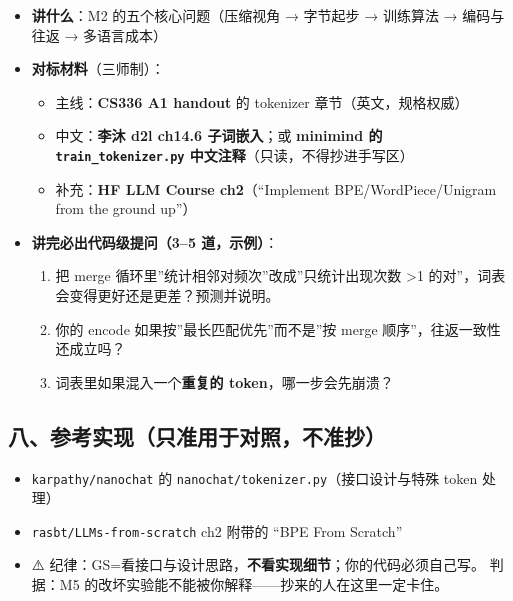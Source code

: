 \documentclass[
  chinese,
  11pt,
]{ctexart}
\providecommand{\tightlist}{%
  \setlength{\itemsep}{0pt}\setlength{\parskip}{0pt}}
\begin{document}
\begin{itemize}
\tightlist
\item
  \textbf{讲什么}：M2 的五个核心问题（压缩视角 → 字节起步 → 训练算法 → 编码与往返 → 多语言成本）
\item
  \textbf{对标材料}（三师制）：

  \begin{itemize}
  \tightlist
  \item
    主线：\textbf{CS336 A1 handout} 的 tokenizer 章节（英文，规格权威）
  \item
    中文：\textbf{李沐 d2l ch14.6 子词嵌入}；或 \textbf{minimind 的 \texttt{train\_tokenizer.py} 中文注释}（只读，不得抄进手写区）
  \item
    补充：\textbf{HF LLM Course ch2}（``Implement BPE/WordPiece/Unigram from the ground up''）
  \end{itemize}
\item
  \textbf{讲完必出代码级提问（3--5 道，示例）}：

  \begin{enumerate}
  \def\labelenumi{\arabic{enumi}.}
  \tightlist
  \item
    把 merge 循环里''统计相邻对频次''改成''只统计出现次数 \textgreater1 的对''，词表会变得更好还是更差？预测并说明。
  \item
    你的 encode 如果按''最长匹配优先''而不是''按 merge 顺序''，往返一致性还成立吗？
  \item
    词表里如果混入一个\textbf{重复的 token}，哪一步会先崩溃？
  \end{enumerate}
\end{itemize}

\subsection{\texorpdfstring{八、参考实现（\textbf{只准用于对照，不准抄}）}{八、参考实现（只准用于对照，不准抄）}}\label{ux516bux53c2ux8003ux5b9eux73b0ux53eaux51c6ux7528ux4e8eux5bf9ux7167ux4e0dux51c6ux6284}

\begin{itemize}
\tightlist
\item
  \texttt{karpathy/nanochat} 的 \texttt{nanochat/tokenizer.py}（接口设计与特殊 token 处理）
\item
  \texttt{rasbt/LLMs-from-scratch} ch2 附带的 ``BPE From Scratch''
\item
  ⚠️ 纪律：GS=看接口与设计思路，\textbf{不看实现细节}；你的代码必须自己写。 判据：M5 的改坏实验能不能被你解释------抄来的人在这里一定卡住。
\end{itemize}
\end{document}

